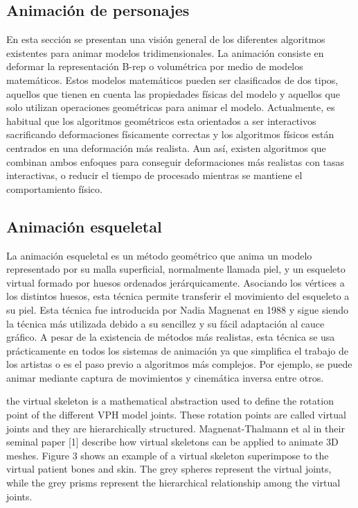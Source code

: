 \subsection{Animación de personajes} 
\label{art:animation}

En esta sección se presentan una visión general de los diferentes algoritmos existentes para animar modelos tridimensionales. La animación consiste en deformar la representación B-rep o volumétrica por medio de modelos matemáticos. Estos modelos matemáticos pueden ser clasificados de dos tipos, aquellos que tienen en cuenta las propiedades físicas del modelo y aquellos que solo utilizan operaciones geométricas para animar el modelo. Actualmente, es habitual que los algoritmos geométricos esta orientados a ser interactivos sacrificando deformaciones físicamente correctas y los algoritmos físicos están centrados en una deformación más realista.  Aun así, existen algoritmos que combinan ambos enfoques para conseguir deformaciones más realistas con tasas interactivas, o reducir el tiempo de procesado mientras se mantiene el comportamiento físico. 


\subsection{Animación esqueletal}
\label{art:virtualskel}

La animación esqueletal es un método geométrico que anima un modelo representado por su malla superficial, normalmente llamada piel, y un esqueleto virtual formado por huesos ordenados jerárquicamente. Asociando los vértices a los distintos huesos, esta técnica permite transferir el movimiento del esqueleto a su piel. Esta técnica fue introducida por Nadia Magnenat en 1988 \cite{thalmann88} y sigue siendo la técnica más utilizada debido a su sencillez y su fácil adaptación al cauce gráfico. A pesar de la existencia de métodos más realistas, esta técnica se usa prácticamente en todos los sistemas de animación ya que simplifica el trabajo de los artistas o es el paso previo a algoritmos más complejos. Por ejemplo, se puede animar mediante captura de movimientos y cinemática inversa entre otros.

the virtual skeleton is a mathematical
abstraction used to define the rotation point of the different VPH model joints.
These rotation points are called virtual joints and they are hierarchically
structured.
Magnenat-Thalmann et al in their seminal paper [1] describe how virtual
skeletons can be applied to animate 3D meshes. Figure 3 shows an example
of a virtual skeleton superimpose to the virtual patient bones and skin. The
grey spheres represent the virtual joints, while the grey prisms represent the
hierarchical relationship among the virtual joints.

